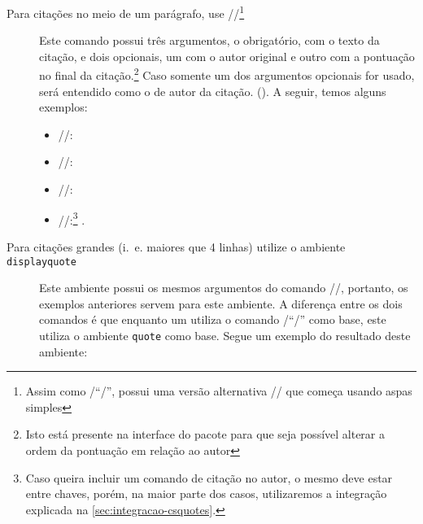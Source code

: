 \begin{description}
	\item [Para citações no meio de um parágrafo, use \latexinline/\textquote/\footnote{%
          Assim como \latexinline/\enquote/, possui uma versão alternativa 
          \latexinline/\textquote*/ que começa usando aspas simples
	      }] Este comando possui três argumentos, o obrigatório, com o texto da citação,
        e dois opcionais, um com o autor original e outro com a pontuação no final da 
        citação.\footnote{Isto está presente na interface do pacote para que seja possível
          alterar a ordem da pontuação em relação ao autor} Caso somente um dos argumentos
          opcionais for usado, será entendido como o de autor da citação.
        (). A seguir, temos alguns exemplos:
        \begin{itemize}
          \item \latexinline//: 
          \item \latexinline//: 
          \item \latexinline//: 
          \item \latexinline//:\footnote{%
              Caso queira incluir um comando de citação no autor, o mesmo deve estar
              entre chaves, porém, na maior parte dos casos, utilizaremos a integração
              explicada na \cref{sec:integracao-csquotes}.
            } .
        \end{itemize}

  \item [Para citações grandes (i.~e. maiores que 4 linhas) utilize o ambiente 
        \texttt{displayquote}] Este ambiente possui os mesmos argumentos do comando
        \latexinline/\textquote/, portanto, os exemplos anteriores servem para este 
        ambiente. A diferença entre os dois comandos é que enquanto um utiliza o
        comando \latexinline/\enquote/ como base, este utiliza o ambiente \verb|quote| 
        como base. Segue um exemplo do resultado deste ambiente:

\end{description}
